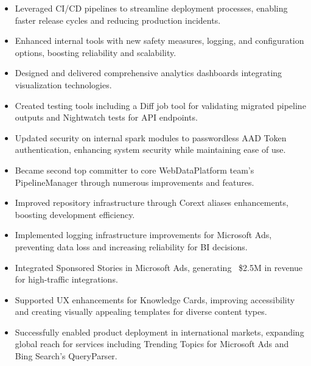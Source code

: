\begin{itemize}
    \item \scriptsize{Leveraged CI/CD pipelines to streamline deployment processes, enabling faster 
        release cycles and reducing production incidents.}
        
    \item \scriptsize{Enhanced internal tools with new safety measures, logging, and configuration 
        options, boosting reliability and scalability.}
        
    \item \scriptsize{Designed and delivered comprehensive analytics dashboards integrating 
        visualization technologies.}
        
    \item \scriptsize{Created testing tools including a Diff job tool for validating migrated pipeline 
        outputs and Nightwatch tests for API endpoints.}
        
    \item \scriptsize{Updated security on internal spark modules to passwordless AAD Token 
        authentication, enhancing system security while maintaining ease of use.}
        
    \item \scriptsize{Became second top committer to core WebDataPlatform team's PipelineManager through 
        numerous improvements and features.}
        
    \item \scriptsize{Improved repository infrastructure through Corext aliases enhancements, boosting 
        development efficiency.}

    \item \scriptsize{Implemented logging infrastructure improvements for Microsoft Ads, preventing data 
        loss and increasing reliability for BI decisions.}
        
    \item \scriptsize{Integrated Sponsored Stories in Microsoft Ads, generating ~\$2.5M in revenue for 
        high-traffic integrations.}
        
    \item \scriptsize{Supported UX enhancements for Knowledge Cards, improving accessibility and 
        creating visually appealing templates for diverse content types.}
        
    \item \scriptsize{Successfully enabled product deployment in international markets, expanding global 
        reach for services including Trending Topics for Microsoft Ads and Bing Search's QueryParser.}
        

\end{itemize}
